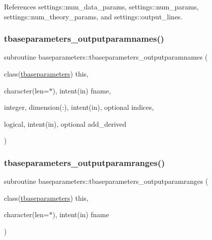 References settings\+::num\+\_\+data\+\_\+params, settings\+::num\+\_\+params, settings\+::num\+\_\+theory\+\_\+params, and settings\+::output\+\_\+lines.

\mbox{\label{namespacebaseparameters_a309e81ed0619c2b91456008b414cf5a9}} 
\subsubsection{\texorpdfstring{tbaseparameters\+\_\+outputparamnames()}{tbaseparameters\_outputparamnames()}}
{\footnotesize\ttfamily subroutine baseparameters\+::tbaseparameters\+\_\+outputparamnames (\begin{DoxyParamCaption}\item[{class(\mbox{\hyperlink{structbaseparameters_1_1tbaseparameters}{tbaseparameters}})}]{this,  }\item[{character(len=$\ast$), intent(in)}]{fname,  }\item[{integer, dimension(\+:), intent(in), optional}]{indices,  }\item[{logical, intent(in), optional}]{add\+\_\+derived }\end{DoxyParamCaption})\hspace{0.3cm}{\ttfamily [private]}}

\mbox{\label{namespacebaseparameters_a7deeecd73224be7473e92a6d48ba8909}} 
\subsubsection{\texorpdfstring{tbaseparameters\+\_\+outputparamranges()}{tbaseparameters\_outputparamranges()}}
{\footnotesize\ttfamily subroutine baseparameters\+::tbaseparameters\+\_\+outputparamranges (\begin{DoxyParamCaption}\item[{class(\mbox{\hyperlink{structbaseparameters_1_1tbaseparameters}{tbaseparameters}})}]{this,  }\item[{character(len=$\ast$), intent(in)}]{fname }\end{DoxyParamCaption})\hspace{0.3cm}{\ttfamily [private]}}

